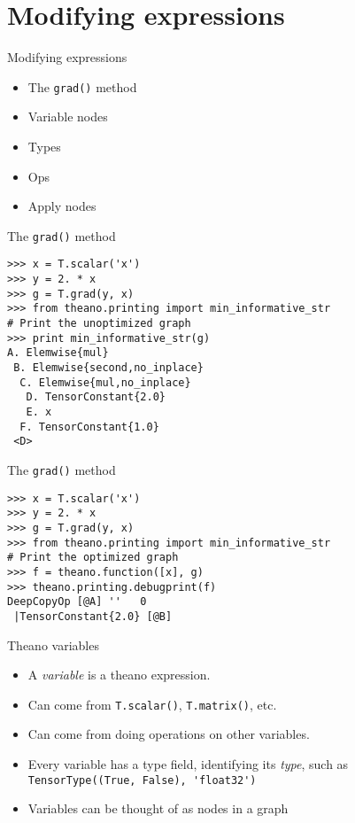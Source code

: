 \documentclass[utf8x,hyperref={pdfpagelabels=false}]{beamer}
\newcommand{\code}[1]{\lstinline[emph={[2]}]|#1|}
\begin{document}
\section{Modifying expressions}
\begin{frame}{Modifying expressions}
  \begin{itemize}
  \item The \code{grad()} method
  \item Variable nodes
  \item Types
  \item Ops
  \item Apply nodes
  \end{itemize}
\end{frame}

\begin{frame}[fragile]{The \code{grad()} method}
\begin{lstlisting}
>>> x = T.scalar('x')
>>> y = 2. * x
>>> g = T.grad(y, x)
>>> from theano.printing import min_informative_str
# Print the unoptimized graph
>>> print min_informative_str(g)
A. Elemwise{mul}
 B. Elemwise{second,no_inplace}
  C. Elemwise{mul,no_inplace}
   D. TensorConstant{2.0}
   E. x
  F. TensorConstant{1.0}
 <D>
\end{lstlisting}
\end{frame}

\begin{frame}[fragile]{The \code{grad()} method}
\begin{lstlisting}
>>> x = T.scalar('x')
>>> y = 2. * x
>>> g = T.grad(y, x)
>>> from theano.printing import min_informative_str
# Print the optimized graph
>>> f = theano.function([x], g)
>>> theano.printing.debugprint(f)
DeepCopyOp [@A] ''   0
 |TensorConstant{2.0} [@B]
\end{lstlisting}
\end{frame}

\begin{frame}{Theano variables}
  \begin{itemize}
  \item A \emph{variable} is a theano expression.
  \item Can come from \code{T.scalar()}, \code{T.matrix()}, etc.
  \item Can come from doing operations on other variables.
  \item Every variable has a type field, identifying its \emph{type}, such as \code{TensorType((True, False), 'float32')}
  \item Variables can be thought of as nodes in a graph
  \end{itemize}
\end{frame}
\end{document}
